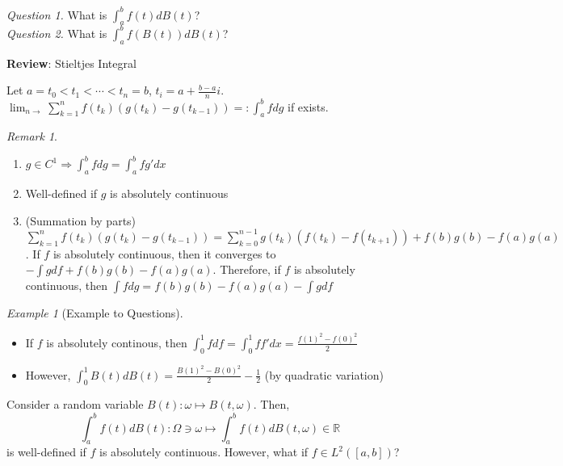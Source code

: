 \documentclass[12pt]{report}
\renewcommand{\1}{\mathbb{1}}
\theoremstyle{break}
\theoremstyle{newdef}
\theoremstyle{remark}
\newtheorem*{exmp}{Example} %
\newtheorem*{rem}{Remark} %
\begin{document}
\textit{Question 1.} What is $\int_a^b f(t) dB(t)$?\\
\textit{Question 2.} What is $\int_a^b f(B(t)) dB(t)$?

\vspace{5mm}

\textbf{Review}: Stieltjes Integral


Let $a = t_0 < t_1 < \cdots < t_n = b$, $t_i = a + \frac{b-a}{n}i$.\\
$\lim_{n\rightarrow}\sum_{k=1}^n f(t_k)(g(t_k)-g(t_{k-1})) =: \int_a^b fdg$ if exists.

\begin{rem}
\leavevmode
\begin{enumerate}
\item $g \in C^1 \Rightarrow \int_a^b fdg = \int_a^b fg'dx$
\item Well-defined if $g$ is absolutely continuous
\item (Summation by parts) $\sum_{k=1}^n f(t_k)(g(t_k)-g(t_{k-1})) = \sum_{k=0}^{n-1} g(t_k)(f(t_k) - f(t_{k+1})) + f(b)g(b) - f(a)g(a)$.
If $f$ is absolutely continuous, then it converges to $-\int gdf + f(b)g(b) - f(a)g(a)$.
Therefore, if $f$ is absolutely continuous, then $\int fdg = f(b)g(b) - f(a)g(a) - \int gdf$
\end{enumerate}
\end{rem}

\begin{exmp}[Example to Questions]
\leavevmode
\begin{itemize}
\item If $f$ is absolutely continous, then $\int_0^1 fdf = \int_0^1 ff'dx = \frac{f(1)^2 - f(0)^2}{2}$
\item However, $\int_0^1 B(t) dB(t) = \frac{B(1)^2 - B(0)^2}{2} - \frac{1}{2}$ (by quadratic variation)
\end{itemize}
\end{exmp}


Consider a random variable $B(t) : \omega \mapsto B(t,\omega)$.
Then, $$ \int_a^b f(t)dB(t) : \Omega \ni \omega \mapsto \int_a^b f(t)dB(t,\omega) \in \mathbb{R} $$
is well-defined if $f$ is absolutely continuous.
However, what if $f \in L^2([a,b])$?
\end{document}
